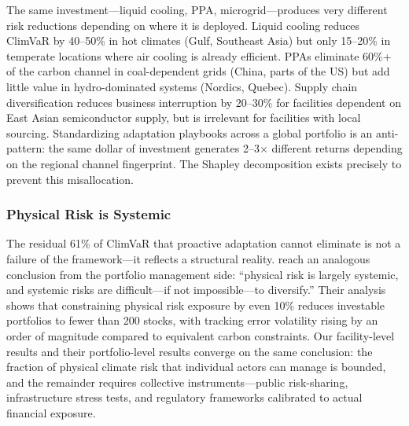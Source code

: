 \begin{twocolbody}
The same investment---liquid cooling, PPA, microgrid---produces very different risk reductions depending on where it is deployed. Liquid cooling reduces ClimVaR by 40--50\% in hot climates (Gulf, Southeast Asia) but only 15--20\% in temperate locations where air cooling is already efficient. PPAs eliminate 60\%+ of the carbon channel in coal-dependent grids (China, parts of the US) but add little value in hydro-dominated systems (Nordics, Quebec). Supply chain diversification reduces business interruption by 20--30\% for facilities dependent on East Asian semiconductor supply, but is irrelevant for facilities with local sourcing. Standardizing adaptation playbooks across a global portfolio is an anti-pattern: the same dollar of investment generates 2--3$\times$ different returns depending on the regional channel fingerprint. The Shapley decomposition exists precisely to prevent this misallocation.

\subsubsection*{Physical Risk is Systemic}

The residual 61\% of ClimVaR that proactive adaptation cannot eliminate is not a failure of the framework---it reflects a structural reality. \citet{luciani2026} reach an analogous conclusion from the portfolio management side: ``physical risk is largely systemic, and systemic risks are difficult---if not impossible---to diversify.'' Their analysis shows that constraining physical risk exposure by even 10\% reduces investable portfolios to fewer than 200 stocks, with tracking error volatility rising by an order of magnitude compared to equivalent carbon constraints. Our facility-level results and their portfolio-level results converge on the same conclusion: the fraction of physical climate risk that individual actors can manage is bounded, and the remainder requires collective instruments---public risk-sharing, infrastructure stress tests, and regulatory frameworks calibrated to actual financial exposure.

\end{twocolbody}
